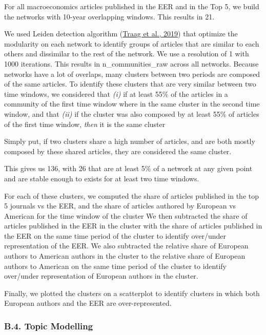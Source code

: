\documentclass[]{elsarticle} %
\begin{document}
For all macroeconomics articles published in the EER and in the Top 5,
we build the networks with 10-year overlapping windows. This results in
21.

We used Leiden detection algorithm
(\protect\hyperlink{ref-traag2019}{Traag et al., 2019}) that optimize
the modularity on each network to identify groups of articles that are
similar to each others and dissimilar to the rest of the network. We use
a resolution of 1 with 1000 iterations. This results in
n\_communities\_raw across all networks. Because networks have a lot of
overlaps, many clusters between two periods are composed of the same
articles. To identify these clusters that are very similar between two
time windows, we considered that \emph{(i)} if at least 55\% of the
articles in a community of the first time window where in the same
cluster in the second time window, and that \emph{(ii)} if the cluster
was also composed by at least 55\% of articles of the first time window,
\emph{then} it is the same cluster

Simply put, if two clusters share a high number of articles, and are
both mostly composed by these shared articles, they are considered the
same cluster.

This gives us 136, with 26 that are at least 5\% of a network at any
given point and are stable enough to exists for at least two time
windows.

For each of these clusters, we computed the share of articles published
in the top 5 journals vs the EER, and the share of articles authored by
European vs American for the time window of the cluster We then
subtracted the share of articles published in the EER in the cluster
with the share of articles published in the EER on the same time period
of the cluster to identify over/under representation of the EER. We also
subtracted the relative share of European authors to American authors in
the cluster to the relative share of European authors to American on the
same time period of the cluster to identify over/under representation of
European authors in the cluster.

Finally, we plotted the clusters on a scatterplot to identify clusters
in which both European authors and the EER are over-represented.

\hypertarget{topic}{%
\subsubsection*{B.4. Topic Modelling}\label{topic}}
\end{document}

